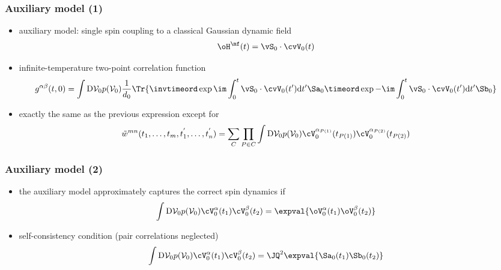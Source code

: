 \begin{frame}
	\frametitle{ Auxiliary model (1) }
    \begin{itemize}
        \item auxiliary model: single spin coupling to a classical Gaussian dynamic field
        \begin{align*}
            \oH^{\mf}(t) &= \vS_0 \cdot \cvV_0(t)
        \end{align*}
        \item infinite-temperature two-point correlation function
        \begin{align*}
            g^{\alpha\beta}(t,0) &= \int \mathrm{D}\mathcal{V}_0 p(\mathcal{V}_0) \frac{1}{d_0} \Tr{ \invtimeord \exp{ \im \int_0^t \vS_0 \cdot \cvV_0(t') \mathrm{d}t' } \Sa_0 \timeord \exp{ -\im \int_0^t \vS_0 \cdot \cvV_0(t') \mathrm{d}t' } \Sb_0 }
        \end{align*}
        \item exactly the same as the previous expression except for 
        \begin{align*}
            \tilde{w}^{mn}(t_1,\dots,t_m,t_1^{'},\dots,t_n^{'}) &= \sum_{C} \prod_{P\in C} \int \mathrm{D}\mathcal{V}_0 p(\mathcal{V}_0) \cV_0^{\alpha_{P(1)}} (t_{P(1)}) \cV_0^{\alpha_{P(2)}} (t_{P(2)})
        \end{align*}
    \end{itemize}
\end{frame}

\begin{frame}
	\frametitle{ Auxiliary model (2) }
    \begin{itemize}
        \item the auxiliary model approximately captures the correct spin dynamics if
        \begin{align*}
            \int \mathrm{D}\mathcal{V}_0 p(\mathcal{V}_0) \cV_0^{\alpha} (t_1) \cV_0^{\beta} (t_2) &= \expval{ \oV_0^{\alpha} (t_1) \oV_0^{\beta} (t_2) }
        \end{align*}
        \item self-consistency condition (pair correlations neglected)
        \begin{align*}
            \int \mathrm{D}\mathcal{V}_0 p(\mathcal{V}_0) \cV_0^{\alpha} (t_1) \cV_0^{\beta} (t_2) &= \JQ^2 \expval{ \Sa_0 (t_1) \Sb_0 (t_2) }
        \end{align*}
    \end{itemize}
\end{frame}



